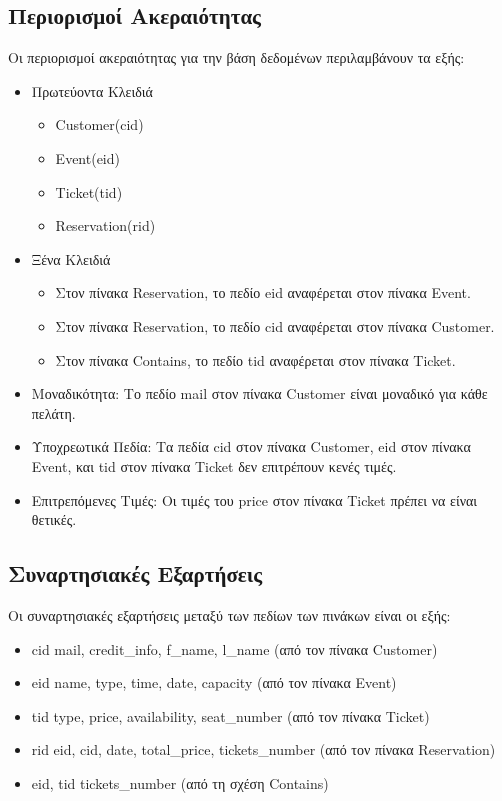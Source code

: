 \documentclass{article}
\begin{document}
\subsection*{Περιορισμοί Ακεραιότητας}
Οι περιορισμοί ακεραιότητας για την βάση δεδομένων περιλαμβάνουν τα εξής:
\begin{itemize}
    \item Πρωτεύοντα Κλειδιά
    \begin{itemize}
        \item Customer(cid)
        \item Event(eid)
        \item Ticket(tid)
        \item Reservation(rid)
    \end{itemize}
    \item Ξένα Κλειδιά
    \begin{itemize}
        \item Στον πίνακα Reservation, το πεδίο eid αναφέρεται στον πίνακα Event.
        \item Στον πίνακα Reservation, το πεδίο cid αναφέρεται στον πίνακα Customer.
        \item Στον πίνακα Contains, το πεδίο tid αναφέρεται στον πίνακα Ticket.
    \end{itemize}
    \item Μοναδικότητα: Το πεδίο mail στον πίνακα Customer είναι μοναδικό για κάθε πελάτη.
    \item Υποχρεωτικά Πεδία: Τα πεδία cid στον πίνακα Customer, eid στον πίνακα Event, και tid στον πίνακα Ticket δεν επιτρέπουν κενές τιμές.
    \item Επιτρεπόμενες Τιμές: Οι τιμές του price στον πίνακα Ticket πρέπει να είναι θετικές.
\end{itemize}

\subsection*{Συναρτησιακές Εξαρτήσεις}
Οι συναρτησιακές εξαρτήσεις μεταξύ των πεδίων των πινάκων είναι οι εξής:
\begin{itemize}
    \item cid \rightarrow mail, credit\_info, f\_name, l\_name (από τον πίνακα Customer)
    \item eid \rightarrow name, type, time, date, capacity (από τον πίνακα Event)
    \item tid \rightarrow type, price, availability, seat\_number (από τον πίνακα Ticket)
    \item rid \rightarrow eid, cid, date, total\_price, tickets\_number (από τον πίνακα Reservation)
    \item eid, tid \rightarrow tickets\_number (από τη σχέση Contains)
\end{itemize}
\end{document}
